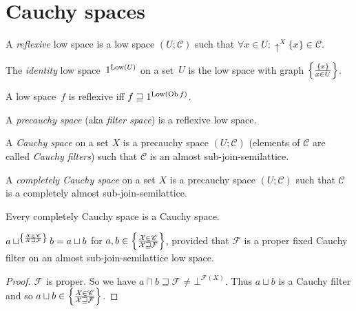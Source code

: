 \section{Cauchy spaces}

\begin{defn}
A \emph{reflexive} low space is a low space $( U ; \mathscr{C})$ such that
$\forall x \in U : \uparrow^X \{ x \} \in \mathscr{C}$.
\end{defn}

\begin{defn}
The \emph{identity} low space~$1^{\operatorname{Low}(U)}$ on a set~$U$ is the low space with graph $\left\{ \frac{\{x\}}{x\in U}\right\}$.
\end{defn}

\begin{obvious}
A low space~$f$ is reflexive iff $f\sqsupseteq 1^{\operatorname{Low}(\operatorname{Ob} f)}$.
\end{obvious}

\begin{defn}
A \emph{precauchy space} (aka \emph{filter space}) is a reflexive low space.
\end{defn}


\begin{defn}
  A \emph{Cauchy space} on a set $X$ is a precauchy space $\left( U ;
  \mathscr{C} \right)$ (elements of $\mathscr{C}$ are called \emph{Cauchy
  filters}) such that $\mathscr{C}$ is an almost sub-join-semilattice.
\end{defn}

\begin{defn}
  A \emph{completely Cauchy space} on a set $X$ is a precauchy space $\left( U ;
  \mathscr{C} \right)$ such that $\mathscr{C}$ is a completely almost sub-join-semilattice.
\end{defn}

\begin{obvious}
Every completely Cauchy space is a Cauchy space.
\end{obvious}

\begin{prop}
  $a\sqcup^{
    \left\{ \frac{\mathcal{X} \in \mathscr{C} }{\mathcal{X} \sqsupseteq \mathcal{F}}\right\}
  } b = a\sqcup b$ for
  $a,b \in \left\{ \frac{\mathcal{X} \in \mathscr{C} }{\mathcal{X} \sqsupseteq \mathcal{F}}\right\}$,
  provided that $\mathcal{F}$ is a proper fixed Cauchy filter on an almost sub-join-semilattice low space.
\end{prop}

\begin{proof}
  $\mathcal{F}$ is proper. So
  we have $a \sqcap b \sqsupseteq \mathcal{F} \neq \bot^{\mathscr{F} (X)}$. Thus $a\sqcup b$ is a Cauchy
  filter and so $a\sqcup b \in \left\{ \frac{\mathcal{X} \in \mathscr{C} }{\mathcal{X} \sqsupseteq \mathcal{F}}\right\}$.
\end{proof}

